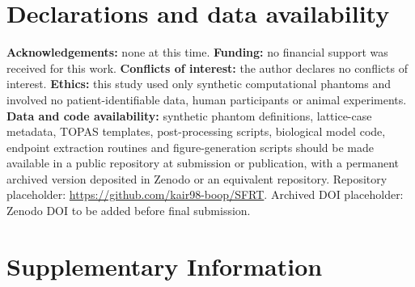 \documentclass[10pt,a4paper]{article}
\begin{document}
\section*{Declarations and data availability}
\textbf{Acknowledgements:} none at this time. \textbf{Funding:} no financial support was received for this work. \textbf{Conflicts of interest:} the author declares no conflicts of interest. \textbf{Ethics:} this study used only synthetic computational phantoms and involved no patient-identifiable data, human participants or animal experiments. \textbf{Data and code availability:} synthetic phantom definitions, lattice-case metadata, TOPAS templates, post-processing scripts, biological model code, endpoint extraction routines and figure-generation scripts should be made available in a public repository at submission or publication, with a permanent archived version deposited in Zenodo or an equivalent repository. Repository placeholder: \url{https://github.com/kair98-boop/SFRT}. Archived DOI placeholder: Zenodo DOI to be added before final submission.

{\scriptsize


}
\section{Supplementary Information}
\end{document}

